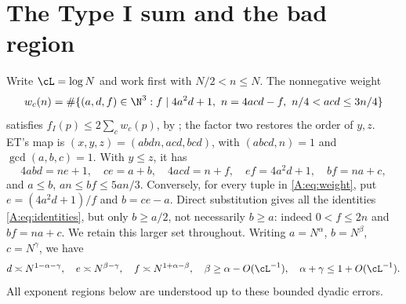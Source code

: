 \section{The Type I sum and the bad region}\label{sec:reduction}
Write $\cL=\log N$ and work first with $N/2<n\le N$. The nonnegative weight
\begin{equation}\label{A:eq:weight}
 w_c(n)=\#\{(a,d,f)\in\N^3:f\mid4a^2d+1,\ n=4acd-f,
                         \ n/4<acd\le3n/4\}
\end{equation}
satisfies $f_I(p)\le2\sum_c w_c(p)$, by \cite[Proposition~2.2,
Lemma~2.8]{ET}; the factor two restores the order of $y,z$.
ET's map is $(x,y,z)=(abdn,acd,bcd)$, with $(abcd,n)=1$ and
$\gcd(a,b,c)=1$. With $y\le z$, it has
\begin{equation}\label{A:eq:identities}
 4abd=ne+1,\quad ce=a+b,\quad4acd=n+f,\quad
 ef=4a^2d+1,\quad bf=na+c,
\end{equation}
and $a\le b$, $an\le bf\le5an/3$.
Conversely, for every tuple in \eqref{A:eq:weight}, put
$e=(4a^2d+1)/f$ and $b=ce-a$. Direct substitution gives all the identities
\eqref{A:eq:identities}, but only $b\ge a/2$, not necessarily $b\ge a$:
indeed $0<f\le2n$ and $bf=na+c$. We retain this larger set throughout.
Writing $a=N^\alpha$, $b=N^\beta$, $c=N^\gamma$, we have
\begin{equation}\label{A:eq:exponents}
 d\asymp N^{1-\alpha-\gamma},\quad e\asymp N^{\beta-\gamma},\quad
 f\asymp N^{1+\alpha-\beta},\quad
 \beta\ge\alpha-O(\cL^{-1}),\quad\alpha+\gamma\le1+O(\cL^{-1}).
\end{equation}
All exponent regions below are understood up to these bounded dyadic errors.

